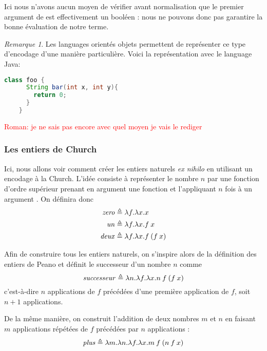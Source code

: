\documentclass {article}
\theoremstyle{definition}
\theoremstyle{remark}
\newtheorem{remark}{Remarque}
\newcommand{\todo}[1]{\textcolor{red}{#1}}
\begin{document}
Ici nous n'avons aucun moyen de vérifier avant normalisation que le
premier argument de \Ifte{} est effectivement un booléen : nous ne
pouvons donc pas garantire la bonne évaluation de notre terme.

\begin{remark}
  Les languages orientés objets permettent de représenter ce type d'encodage d'une manière particulière.
  Voici la représentation avec le language Java:
  \begin{lstlisting}[language=java]
    class foo {
      String bar(int x, int y){
        return 0;
      }
    }
  \end{lstlisting}

  \todo{Roman: je ne sais pas encore avec quel moyen je vais le rediger}
\end{remark}


\subsubsection{Les entiers de Church}

\newcommand{\Zero}{\mathit{zero}}
\newcommand{\Un}{\mathit{un}}
\newcommand{\Deux}{\mathit{deux}}
\newcommand{\Succ}{\mathit{successeur}}
\newcommand{\Plus}{\mathit{plus}}


Ici, nous allons voir comment créer les entiers naturels \textit{ex
  nihilo} en utilisant un encodage à la Church. L'idée consiste à
représenter le nombre \(n\) par une fonction d'ordre supérieur prenant
en argument une fonction  et l'appliquant \(n\) fois à un
argument . On définira donc
%
\begin{align*}
\Zero &\triangleq \Lam{f}{\Lam{x}{x}}\\ 
\Un   &\triangleq \Lam{f}{\Lam{x}{\App{f}{x}}} \\
\Deux &\triangleq \Lam{f}{\Lam{x}{\App{f}{(\App{f}{x}})}}
\end{align*}

Afin de construire tous les entiers naturels, on s'inspire alors de la
définition des entiers de Peano et définit le successeur d'un nombre \(n\)
comme
%
\[
\Succ \triangleq \Lam{n}{\Lam{f}{\Lam{x}{\App{\App{n}{f}}{(\App{f}{x})}}}}
\]
%
c'est-à-dire \(n\) applications de \(f\) précédées d'une première
application de \(f\), soit \(n+1\) applications.

De la même manière, on construit l'addition de deux nombres \(m\) et
\(n\) en faisant \(m\) applications répétées de \(f\) précédées par
\(n\) applications :
%
\[
\Plus \triangleq \Lam{m}{\Lam{n}{\Lam{f}{\Lam{x}{\App{\App{m}{f}}{(\App{\App{n}{f}}{x}})}}}}
\]
\end{document}
